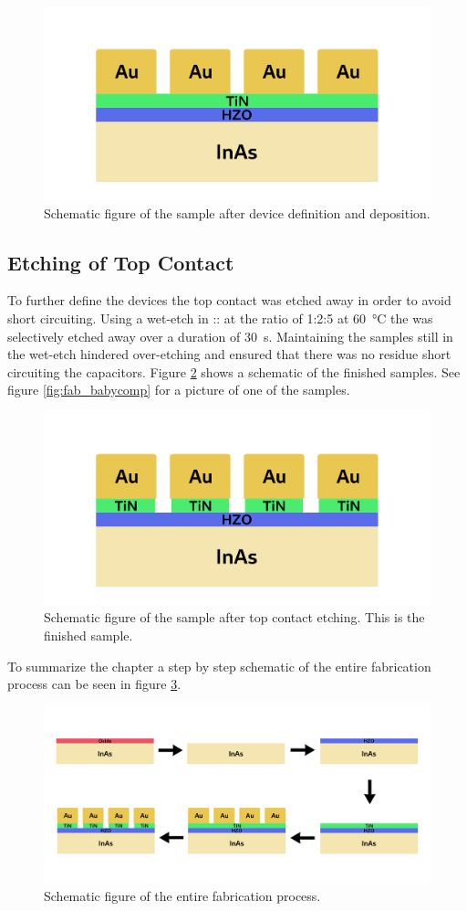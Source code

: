 \documentclass[11pt,twoside,final]{eitExjobb}  %
\begin{document}
\begin{figure}[htbp]
    \centering
    \includegraphics[width=.45\linewidth]{fig/fabproc/fab_4.png}
    \caption{Schematic figure of the sample after device definition and 
    deposition.}\label{fig:fab_4}
\end{figure}

\subsection{Etching of Top Contact}
To further define the devices the  top contact was etched away in order
to avoid short circuiting. Using a wet-etch in :: at
the ratio of 1:2:5 at \SI{60}{\celsius} the  was selectively etched
away over a duration of \SI{30}{\second}. Maintaining the samples still in the
wet-etch hindered over-etching and ensured that there was no residue 
short circuiting the capacitors. Figure \ref{fig:fab_5} shows a schematic of
the finished samples. See figure \ref{fig:fab_babycomp} for a picture of one of
the samples.

\begin{figure}[htbp]
    \centering
    \includegraphics[width=.45\linewidth]{fig/fabproc/fab_5.png}
    \caption{Schematic figure of the sample after top contact etching. This is
    the finished sample.}\label{fig:fab_5}
\end{figure}

To summarize the chapter a step by step schematic of the entire fabrication
process can be seen in figure \ref{fig:fab_done}.

\begin{figure}[htbp]
    \centering
    \includegraphics[width=.80\linewidth]{fig/fabproc/fab_done.png}
    \caption{Schematic figure of the entire fabrication process.}\label{fig:fab_done}
\end{figure}
\end{document}
